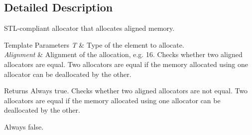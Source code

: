 \subsection{Detailed Description}
S\+T\+L-\/compliant allocator that allocates aligned memory. 
\begin{DoxyTemplParams}{Template Parameters}
{\em T} & Type of the element to allocate. \\
\hline
{\em Alignment} & Alignment of the allocation, e.\+g. 16. Checks whether two aligned allocators are equal. Two allocators are equal if the memory allocated using one allocator can be deallocated by the other. \\
\hline
\end{DoxyTemplParams}
\begin{DoxyReturn}{Returns}
Always {\ttfamily true}. Checks whether two aligned allocators are not equal. Two allocators are equal if the memory allocated using one allocator can be deallocated by the other. 

Always {\ttfamily false}. 
\end{DoxyReturn}
